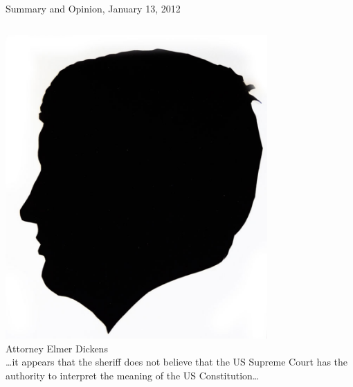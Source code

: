 \begin{frame}{Summary and Opinion, January 13, 2012}
    \begin{columns}[onlytextwidth]
            \centering
            \includegraphics[width=0.75\textwidth]{img/elmer-dickens.png}
            \\ Attorney Elmer Dickens \\
\ldots it appears that the sheriff  does not believe that the US Supreme Court has the authority to interpret the meaning of the US Constitution\ldots
    \end{columns}
\end{frame}

